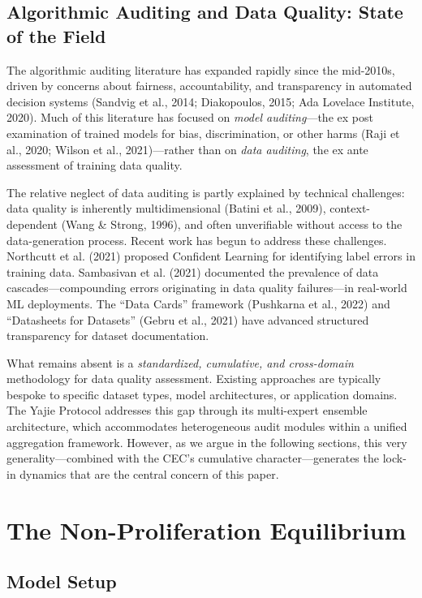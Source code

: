 \documentclass[12pt,a4paper]{article}
\theoremstyle{definition}
\theoremstyle{remark}
\begin{document}
\subsection{Algorithmic Auditing and Data Quality: State of the Field}

The algorithmic auditing literature has expanded rapidly since the mid-2010s, driven by concerns about fairness, accountability, and transparency in automated decision systems (Sandvig et al., 2014; Diakopoulos, 2015; Ada Lovelace Institute, 2020). Much of this literature has focused on \textit{model auditing}—the ex post examination of trained models for bias, discrimination, or other harms (Raji et al., 2020; Wilson et al., 2021)—rather than on \textit{data auditing}, the ex ante assessment of training data quality.

The relative neglect of data auditing is partly explained by technical challenges: data quality is inherently multidimensional (Batini et al., 2009), context-dependent (Wang \& Strong, 1996), and often unverifiable without access to the data-generation process. Recent work has begun to address these challenges. Northcutt et al. (2021) proposed Confident Learning for identifying label errors in training data. Sambasivan et al. (2021) documented the prevalence of data cascades—compounding errors originating in data quality failures—in real-world ML deployments. The ``Data Cards'' framework (Pushkarna et al., 2022) and ``Datasheets for Datasets'' (Gebru et al., 2021) have advanced structured transparency for dataset documentation.

What remains absent is a \textit{standardized, cumulative, and cross-domain} methodology for data quality assessment. Existing approaches are typically bespoke to specific dataset types, model architectures, or application domains. The Yajie Protocol addresses this gap through its multi-expert ensemble architecture, which accommodates heterogeneous audit modules within a unified aggregation framework. However, as we argue in the following sections, this very generality—combined with the CEC's cumulative character—generates the lock-in dynamics that are the central concern of this paper.

\section{The Non-Proliferation Equilibrium}

\subsection{Model Setup}
\end{document}
